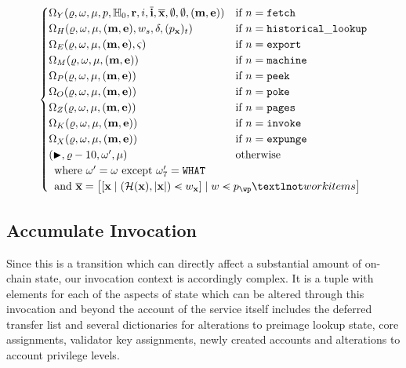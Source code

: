 \begin{align}
\begin{cases}
      \Omega_Y(\gascounter, \registers, \memory, p, \H_0, \mathbf{r}, i, \overline{\mathbf{i}}, \overline{\mathbf{x}}, \none, \none, (\mathbf{m}, \mathbf{e})) &\when n = \mathtt{fetch}\\
      \Omega_H(\gascounter, \registers, \memory, (\mathbf{m}, \mathbf{e}), w_s, \accounts, (p_\mathbf{x})_t) &\when n = \mathtt{historical\_lookup}\\
      \Omega_E(\gascounter, \registers, \memory, (\mathbf{m}, \mathbf{e}), \segoff) &\when n = \mathtt{export}\\
      \Omega_M(\gascounter, \registers, \memory, (\mathbf{m}, \mathbf{e})) &\when n = \mathtt{machine}\\
      \Omega_P(\gascounter, \registers, \memory, (\mathbf{m}, \mathbf{e})) &\when n = \mathtt{peek}\\
      \Omega_O(\gascounter, \registers, \memory, (\mathbf{m}, \mathbf{e})) &\when n = \mathtt{poke}\\
      \Omega_Z(\gascounter, \registers, \memory, (\mathbf{m}, \mathbf{e})) &\when n = \mathtt{pages}\\
      \Omega_K(\gascounter, \registers, \memory, (\mathbf{m}, \mathbf{e})) &\when n = \mathtt{invoke}\\
      \Omega_X(\gascounter, \registers, \memory, (\mathbf{m}, \mathbf{e})) &\when n = \mathtt{expunge}\\
      (\continue, \gascounter - 10, \registers', \memory) &\otherwise\\
      \multicolumn{2}{l}{\where \registers' = \registers \exc \registers'_7 = \mathtt{WHAT}} \\
      \multicolumn{2}{l}{\also \overline{\mathbf{x}} = \sq{\sq{\mathbf{x} \mid (\blake(\mathbf{x}), |\mathbf{x}|) \orderedin w_\mathbf{x}} \mid w \orderedin p_\wp¬workitems}}
    \end{cases}
\end{align}

\subsection{Accumulate Invocation}\label{sec:accumulateinvocation}

Since this is a transition which can directly affect a substantial amount of on-chain state, our invocation context is accordingly complex. It is a tuple with elements for each of the aspects of state which can be altered through this invocation and beyond the account of the service itself includes the deferred transfer list and several dictionaries for alterations to preimage lookup state, core assignments, validator key assignments, newly created accounts and alterations to account privilege levels.

